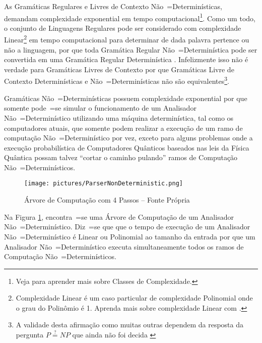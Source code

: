 {    As Gramáticas Regulares e
    Livres de Contexto Não~=Determinísticas,
    demandam complexidade exponential em tempo computacional\footnote{
    Veja  para aprender mais sobre Classes de Complexidade.
    }.
    Como um todo,
    o conjunto de Linguagens Regulares pode ser considerado com complexidade Linear\footnote{
    Complexidade Linear é um caso particular de complexidade Polinomial onde o grau do Polinômio é 1.
    Aprenda mais sobre complexidade Linear com .
    } em tempo computacional para determinar de dada palavra pertence ou
    não a linguagem,
    por que toda Gramática Regular Não~=Determinística pode ser convertida em uma Gramática Regular Determinística \cite{sipserBook}.
    Infelizmente isso não é verdade para Gramáticas Livres de Contexto por que Gramáticas Livre de Contexto Determinísticas e
    Não~=Determinísticas não são equivalentes\footnote{
    A validade desta afirmação como muitas outras dependem da resposta da pergunta $P \stackrel{?}{=} NP$ que ainda não foi decida \cite{computationalComplexityAuroraBarak,turingMachinesRoyer}
    }.

    Gramáticas Não~=Determinísticas possuem complexidade exponential por que somente pode~=se simular o funcionamento de um Analisador Não~=Determinístico utilizando uma máquina determinística,
    tal como os computadores atuais,
    que somente podem realizar a execução de um ramo de computação Não~=Determinístico por vez,
    exceto para alguns problemas onde a execução probabilística de Computadores Quânticos \cite{nonlinearQuantumComputers} baseados nas leis da Física Quântica \cite{dicke1963QuantumPhysicsIntroduction} possam talvez ``cortar o caminho pulando'' ramos de Computação Não~=Determinísticos.
    \begin{figure}[H]
    \centering
    \texttt{[image: pictures/ParserNonDeterministic.png]}
    \caption{Árvore de Computação com 4 Passos -- Fonte Própria}
    \label{fig:pictures/ParserNonDeterministic.png}
    \end{figure}

    Na Figura \ref{fig:pictures/ParserNonDeterministic.png},
    encontra~=se uma Árvore de Computação de um Analisador Não~=Determinístico.
    Diz~=se que que o tempo de execução de um Analisador Não~=Determinístico é Linear ou
    Polinomial ao tamanho da entrada por que um Analisador Não~=Determinístico executa simultaneamente todos os ramos de Computação Não~=Determinísticos.

}
